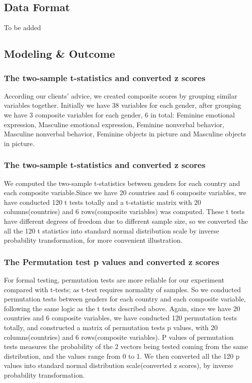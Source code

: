 \documentclass{article}
\begin{document}
	\subsection{Data Format}
	To be added
	
	\subsection{Modeling \& Outcome}
	\subsubsection{The two-sample t-statistics and converted z scores}
	According our clients’ advice, we created composite scores by grouping similar variables together. Initially we have 38 variables for each gender, after grouping we have 3 composite variables for each gender, 6 in total: Feminine emotional expression, Masculine emotional expression, Feminine nonverbal behavior, Masculine nonverbal behavior, Feminine objects in picture and Masculine objects in picture. 
	\subsubsection{The two-sample t-statistics and converted z scores}
	We computed the two-sample t-statistics between genders for each country and each composite variable.Since we have 20 countries and 6 composite variables, we have conducted 120 t tests totally and a t-statistic matrix with 20 columns(countries) and 6 rows(composite variables) was computed. These t tests have different degrees of freedom due to different sample size, so we converted the all the 120 t statistics into standard normal distribution scale by inverse probability transformation, for more convenient illustration.
	\subsubsection{The Permutation test p values and converted z scores}
	For formal testing, permutation tests are more reliable for our experiment compared with t-tests; as t-test requires normality of samples. So we conducted permutation tests between genders for each country and each composite variable, following the same logic as the t tests described above. Again, since we have 20 countries and 6 composite variables, we have conducted 120 permutation tests totally, and constructed a matrix of permutation tests p values, with 20 columns(countries) and 6 rows(composite variables). P values of permutation tests measures the probability of the 2 vectors being tested coming from the same distribution, and the values range from 0 to 1. We then converted all the 120 p values into standard normal distribution scale(converted z scores), by inverse probability transformation.
\end{document}
